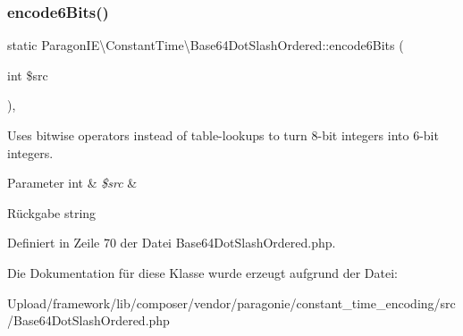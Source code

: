 \subsubsection{\texorpdfstring{encode6\+Bits()}{encode6Bits()}}
{\footnotesize\ttfamily static Paragon\+I\+E\textbackslash{}\+Constant\+Time\textbackslash{}\+Base64\+Dot\+Slash\+Ordered\+::encode6\+Bits (\begin{DoxyParamCaption}\item[{int}]{\$src }\end{DoxyParamCaption})\hspace{0.3cm}{\ttfamily [static]}, {\ttfamily [protected]}}

Uses bitwise operators instead of table-\/lookups to turn 8-\/bit integers into 6-\/bit integers.


\begin{DoxyParams}[1]{Parameter}
int & {\em \$src} & \\
\hline
\end{DoxyParams}
\begin{DoxyReturn}{Rückgabe}
string 
\end{DoxyReturn}


Definiert in Zeile 70 der Datei Base64\+Dot\+Slash\+Ordered.\+php.



Die Dokumentation für diese Klasse wurde erzeugt aufgrund der Datei\+:\begin{DoxyCompactItemize}
\item 
Upload/framework/lib/composer/vendor/paragonie/constant\+\_\+time\+\_\+encoding/src/Base64\+Dot\+Slash\+Ordered.\+php\end{DoxyCompactItemize}
